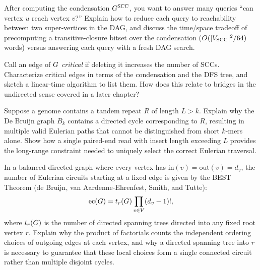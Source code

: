 \begin{exercise}
After computing the condensation $G^{\mathrm{SCC}}$, you want to answer many queries ``can vertex $u$ reach vertex $v$?'' Explain how to reduce each query to reachability between two super-vertices in the DAG, and discuss the time/space tradeoff of precomputing a transitive-closure bitset over the condensation ($O(\lvert V_{\mathrm{SCC}}\rvert^2/64)$ words) versus answering each query with a fresh DAG search.
\end{exercise}

\begin{exercise}
Call an edge of $G$ \emph{critical} if deleting it increases the number of SCCs. Characterize critical edges in terms of the condensation and the DFS tree, and sketch a linear-time algorithm to list them. How does this relate to bridges in the undirected sense covered in a later chapter?
\end{exercise}

\begin{exercise}
\label{ch05:ex-debruijn-repeats}
Suppose a genome contains a tandem repeat $R$ of length $L > k$. Explain why the De Bruijn graph $B_k$ contains a directed cycle corresponding to $R$, resulting in multiple valid Eulerian paths that cannot be distinguished from short $k$-mers alone. Show how a single paired-end read with insert length exceeding $L$ provides the long-range constraint needed to uniquely select the correct Eulerian traversal.
\end{exercise}

\begin{exercise}
\label{ch05:ex-best-thm}
In a balanced directed graph where every vertex has $\mathrm{in}(v) = \mathrm{out}(v) = d_v$, the number of Eulerian circuits starting at a fixed edge is given by the BEST Theorem (de Bruijn, van Aardenne-Ehrenfest, Smith, and Tutte):
\[
\mathrm{ec}(G) = t_r(G) \prod_{v \in V} (d_v - 1)!,
\]
where $t_r(G)$ is the number of directed spanning trees directed into any fixed root vertex $r$. Explain why the product of factorials counts the independent ordering choices of outgoing edges at each vertex, and why a directed spanning tree into $r$ is necessary to guarantee that these local choices form a single connected circuit rather than multiple disjoint cycles.
\end{exercise}
